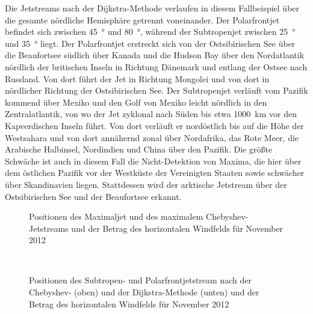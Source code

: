 Die Jetstreams nach der Dijkstra-Methode verlaufen in diesem Fallbeispiel über die gesamte nördliche Hemisphäre getrennt voneinander. Der Polarfrontjet befindet sich zwischen \SI{45}{\degree} und \SI{80}{\degree}, während der Subtropenjet zwischen \SI{25}{\degree} und \SI{35}{\degree} liegt. Der Polarfrontjet erstreckt sich von der Ostsibirischen See über die Beau\-fort\-see südlich über Kanada und die Hudson Bay über den Nordatlantik nördlich der britischen Inseln in Richtung Dänemark und entlang der Ostsee nach Russland. Von dort führt der Jet in Richtung Mongolei und von dort in nördlicher Richtung der Ostsibirischen See. Der Subtropenjet verläuft vom Pazifik kommend über Mexiko und den Golf von Mexiko leicht nördlich in den Zentralatlantik, von wo der Jet zyklonal nach Süden bis etwa \SI{1000}{\kilo\metre} vor den Kapverdischen Inseln führt. Von dort verläuft er nordöstlich bis auf die Höhe der Westsahara und von dort annähernd zonal über Nordafrika, das Rote Meer, die Arabische Halbinsel, Nordindien und China über den Pazifik. Die größte Schwäche ist auch in diesem Fall die Nicht-Detektion von Maxima, die hier über dem östlichen Pazifik vor der Westküste der Vereinigten Staaten sowie schwächer über Skandinavien liegen. Stattdessen wird der arktische Jetstream über der Ostsibirischen See und der Beaufortsee erkannt.

\begin{figure}[hbt] 
  \centering
  \begin{minipage}{\textwidth}
    \centering
  \end{minipage}
  \caption[Vergleich des maximalen Chebyshev-Fits und des meridionalen Maximums für November 2012]{Positionen des Maximaljet und des maximalem Chebyshev-Jetstreams und der Betrag des horizontalen Windfelds für November 2012} \label{fig:case-2012-nov-a}
\end{figure}


\begin{figure}[hbt] 
  \centering
  \begin{minipage}{\textwidth}
    \centering
  \end{minipage} \\ 
  \begin{minipage}{\textwidth}
    \centering
  \end{minipage}
  \caption[Vergleich der Chebyshev- und der Dijkstra-Methode für den November 2012]{Positionen des Subtropen- und Polarfrontjetstream nach der Chebyshev- (oben) und der Dijkstra-Methode (unten) und der Betrag des horizontalen Windfelds für November 2012} \label{fig:case-2012-nov-b}
\end{figure}




